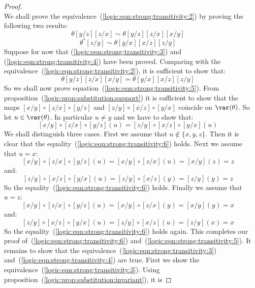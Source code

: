 \begin{proof}
\begin{equation}
    \end{equation}
We shall prove the
equivalence~(\ref{logic:eqn:strong:transitivity:2}) by proving the
following two results:
    \begin{equation}\label{logic:eqn:strong:transitivity:3}
    \theta[y/z][z/x]\sim\theta[y/z][z/x][x/y]
    \end{equation}
    \begin{equation}\label{logic:eqn:strong:transitivity:4}
    \theta^{*}[z/y]\sim\theta[y/x][x/z][z/y]
    \end{equation}
Suppose for now that (\ref{logic:eqn:strong:transitivity:3}) and
(\ref{logic:eqn:strong:transitivity:4}) have been proved. Comparing
with the equivalence~(\ref{logic:eqn:strong:transitivity:2}), it is
sufficient to show that:
    \begin{equation}\label{logic:eqn:strong:transitivity:5}
    \theta[y/z][z/x][x/y]=\theta[y/x][x/z][z/y]
    \end{equation}
So we shall now prove
equation~(\ref{logic:eqn:strong:transitivity:5}). From
proposition~(\ref{logic:prop:substitution:support}) it is sufficient
to show that the maps $[x/y]\circ[z/x]\circ[y/z]$ and
$[z/y]\circ[x/z]\circ[y/x]$ coincide on $\var(\theta)$. So let
$u\in\var(\theta)$. In particular $u\neq y$ and we have to show
that:
    \begin{equation}\label{logic:eqn:strong:transitivity:6}
    [x/y]\circ[z/x]\circ[y/z](u)=[z/y]\circ[x/z]\circ[y/x](u)
    \end{equation}
We shall distinguish three cases. First we assume that
$u\not\in\{x,y,z\}$. Then it is clear that the
equality~(\ref{logic:eqn:strong:transitivity:6}) holds. Next we
assume that $u=x$:
    \[
    [x/y]\circ[z/x]\circ[y/z](u)=[x/y]\circ[z/x](u)=[x/y](z)=z
    \]
and:
    \[
    [z/y]\circ[x/z]\circ[y/x](u) = [z/y]\circ[x/z](y)=[z/y](y)=z
    \]
So the equality~(\ref{logic:eqn:strong:transitivity:6}) holds.
Finally we assume that $u=z$:
    \[
    [x/y]\circ[z/x]\circ[y/z](u)=[x/y]\circ[z/x](y)=[x/y](y)=x
    \]
and:
    \[
    [z/y]\circ[x/z]\circ[y/x](u) = [z/y]\circ[x/z](u)=[z/y](x)=x
    \]
So the equality~(\ref{logic:eqn:strong:transitivity:6}) holds again.
This completes our proof of~(\ref{logic:eqn:strong:transitivity:6})
and~(\ref{logic:eqn:strong:transitivity:5}). It remains to show that
the equivalence~(\ref{logic:eqn:strong:transitivity:3})
and~(\ref{logic:eqn:strong:transitivity:4}) are true. First we show
the equivalence~(\ref{logic:eqn:strong:transitivity:3}). Using
proposition~(\ref{logic:prop:substitution:invariant}), it is

\end{proof}
